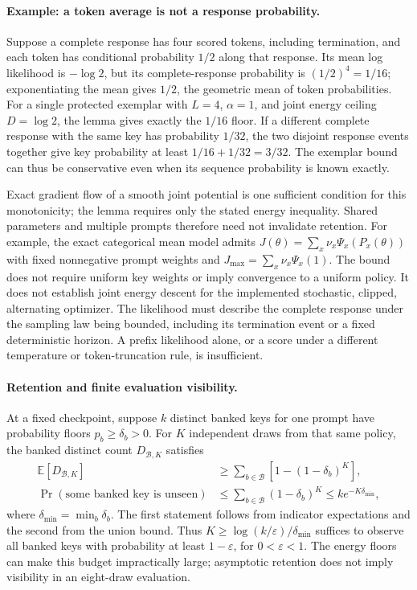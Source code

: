\paragraph{Example: a token average is not a response probability.}
Suppose a complete response has four scored tokens, including termination,
and each token has conditional probability $1/2$ along that response. Its
mean log likelihood is $-\log2$, but its complete-response probability is
$(1/2)^4=1/16$; exponentiating the mean gives $1/2$, the geometric mean of
token probabilities. For a single protected exemplar with $L=4$, $\alpha=1$,
and joint energy ceiling $D=\log2$, the lemma gives exactly the $1/16$ floor.
If a different complete response with the same key has probability $1/32$,
the two disjoint response events together give key probability at least
$1/16+1/32=3/32$. The exemplar bound can thus be conservative even when its
sequence probability is known exactly.

Exact gradient flow of a smooth joint potential is one sufficient condition
for this monotonicity; the lemma requires only the stated energy inequality.
Shared parameters and multiple prompts therefore need not invalidate
retention. For example, the exact categorical mean model admits
$J(\theta)=\sum_x\nu_x\Psi_x(P_x(\theta))$ with fixed nonnegative prompt
weights and $J_{\max}=\sum_x\nu_x\Psi_x(1)$. The bound does not require
uniform key weights or imply convergence to a uniform policy. It does not
establish joint energy descent for the implemented stochastic, clipped,
alternating optimizer. The likelihood must describe the complete response
under the sampling law being bounded, including its termination event or a
fixed deterministic horizon. A prefix likelihood alone, or a score under a
different temperature or token-truncation rule, is insufficient.

\paragraph{Retention and finite evaluation visibility.}
At a fixed checkpoint, suppose $k$ distinct banked keys for one prompt have
probability floors $p_b\ge\delta_b>0$. For $K$ independent draws from that
same policy, the banked distinct count $D_{\mathcal B,K}$ satisfies
\[
 \begin{aligned}
 \mathbb E[D_{\mathcal B,K}]
 &\ge\sum_{b\in\mathcal B}\left[1-(1-\delta_b)^K\right],\\
 \Pr(\text{some banked key is unseen})
 &\le\sum_{b\in\mathcal B}(1-\delta_b)^K
 \le k e^{-K\delta_{\min}},
 \end{aligned}
\]
where $\delta_{\min}=\min_b\delta_b$. The first statement follows from
indicator expectations and the second from the union bound. Thus
$K\ge\log(k/\varepsilon)/\delta_{\min}$ suffices to observe all banked keys
with probability at least $1-\varepsilon$, for $0<\varepsilon<1$.
The energy floors can make this budget impractically large; asymptotic
retention does not imply visibility in an eight-draw evaluation.


